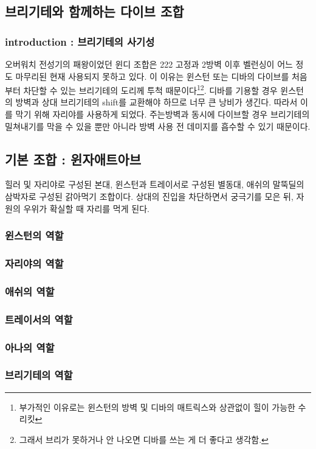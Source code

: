 \subsection{브리기테와 함께하는 다이브 조합}
\subsubsection{introduction : 브리기테의 사기성}
오버워치 전성기의 패왕이었던 윈디 조합은 222 고정과 2방벽 이후 벨런싱이 어느 정도 마무리된 현재 사용되지 못하고 있다. 이 이유는 윈스턴 또는 디바의 다이브를 처음부터 차단할 수 있는 브리기테의 도리께 투척 때문이다\footnote{부가적인 이유로는 윈스턴의 방벽 및 디바의 매트릭스와 상관없이 힐이 가능한 수리킷}\footnote{그래서 브리가 못하거나 안 나오면 디바를 쓰는 게 더 좋다고 생각함.}. 디바를 기용할 경우 윈스턴의 방벽과 상대 브리기테의 shift를 교환해야 하므로 너무 큰 낭비가 생긴다. 따라서 이를 막기 위해 자리야를 사용하게 되었다. 주는방벽과 동시에 다이브할 경우 브리기테의 밀쳐내기를 막을 수 있을 뿐만 아니라 방벽 사용 전 데미지를 흡수할 수 있기 때문이다.

\subsection{기본 조합 : 윈자애트아브}
힐러 및 자리야로 구성된 본대, 윈스턴과 트레이서로 구성된 별동대, 애쉬의 말뚝딜의 삼박자로 구성된 갉아먹기 조합이다. 상대의 진입을 차단하면서 궁극기를 모은 뒤, 자원의 우위가 확실할 때 자리를 먹게 된다.  
\subsubsection{윈스턴의 역할}
\subsubsection{자리야의 역할}
\subsubsection{애쉬의 역할}
\subsubsection{트레이서의 역할}
\subsubsection{아나의 역할}
\subsubsection{브리기테의 역할}